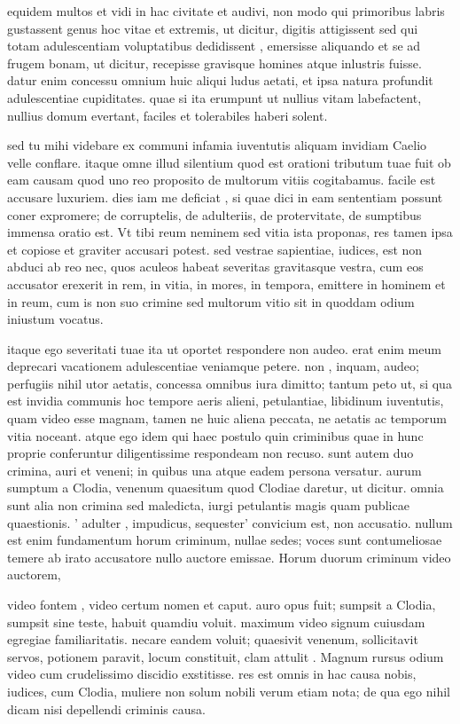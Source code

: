  equidem multos et vidi in hac civitate et audivi, non modo qui primoribus labris gustassent genus hoc vitae et extremis, ut dicitur, digitis attigissent sed qui totam adulescentiam voluptatibus dedidissent , emersisse aliquando et se ad frugem bonam, ut dicitur, recepisse gravisque homines atque inlustris fuisse. datur enim concessu omnium huic aliqui ludus aetati, et ipsa natura profundit adulescentiae cupiditates. quae si ita erumpunt ut nullius vitam labefactent, nullius domum evertant, faciles et tolerabiles haberi solent.

 sed tu mihi videbare ex communi infamia iuventutis aliquam invidiam Caelio velle conflare. itaque omne illud silentium quod est orationi tributum tuae fuit ob eam causam quod uno reo proposito de multorum vitiis cogitabamus. facile est accusare luxuriem. dies iam me deficiat , si quae dici in eam sententiam possunt coner expromere; de corruptelis, de adulteriis, de protervitate, de sumptibus immensa oratio est. Vt tibi reum neminem sed vitia ista proponas, res tamen ipsa et copiose et graviter accusari potest. sed vestrae sapientiae, iudices, est non abduci ab reo nec, quos aculeos habeat severitas gravitasque vestra, cum eos accusator erexerit in rem, in vitia, in mores, in tempora, emittere in hominem et in reum, cum is non suo crimine sed multorum vitio sit in quoddam odium iniustum vocatus.

 itaque ego severitati tuae ita ut oportet respondere non audeo. erat enim meum deprecari vacationem adulescentiae veniamque petere. non , inquam, audeo; perfugiis nihil utor aetatis, concessa omnibus iura dimitto; tantum peto ut, si qua est invidia communis hoc tempore aeris alieni, petulantiae, libidinum iuventutis, quam video esse magnam, tamen ne huic aliena peccata, ne aetatis ac temporum vitia noceant. atque ego idem qui haec postulo quin criminibus quae in hunc proprie conferuntur diligentissime respondeam non recuso. sunt autem duo crimina, auri et veneni; in quibus una atque eadem persona versatur. aurum sumptum a Clodia, venenum quaesitum quod Clodiae daretur, ut dicitur. omnia sunt alia non crimina sed maledicta, iurgi petulantis magis quam publicae quaestionis. ' adulter , impudicus, sequester' convicium est, non accusatio. nullum est enim fundamentum horum criminum, nullae sedes; voces sunt contumeliosae temere ab irato accusatore nullo auctore emissae. Horum duorum criminum video auctorem,

 video fontem , video certum nomen et caput. auro opus fuit; sumpsit a Clodia, sumpsit sine teste, habuit quamdiu voluit. maximum video signum cuiusdam egregiae familiaritatis. necare eandem voluit; quaesivit venenum, sollicitavit servos, potionem paravit, locum constituit, clam attulit . Magnum rursus odium video cum crudelissimo discidio exstitisse. res est omnis in hac causa nobis, iudices, cum Clodia, muliere non solum nobili verum etiam nota; de qua ego nihil dicam nisi depellendi criminis causa.

